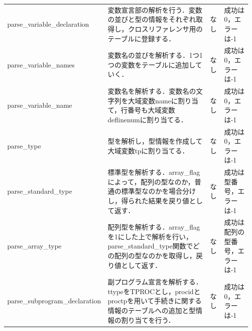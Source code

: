 \documentclass{jlreq}
\begin{document}
\begin{table}[H]
{\begin{tabular}{|l|p{15cm}|l|p{6cm}|}
      parse\_variable\_declaration    & 変数宣言部の解析を行う．変数の並びと型の情報をそれぞれ取得し，クロスリファレンサ用のテーブルに登録する．                                                                                                                                                       & なし & 成功は0，エラーは-1                \\
      parse\_variable\_names          & 変数名の並びを解析する．1つ1つの変数をテーブルに追加していく．                                                                                                                                                                                                 & なし & 成功は0，エラーは-1                \\
      parse\_variable\_name           & 変数名を解析する．変数名の文字列を大域変数nameに割り当て，行番号も大域変数deflinenumに割り当てる．                                                                                                                                                             & なし & 成功は0，エラーは-1                \\
      parse\_type                     & 型を解析し，型情報を作成して大域変数tpに割り当てる．                                                                                                                                                                                                           & なし & 成功は0，エラーは-1                \\
      parse\_standard\_type           & 標準型を解析する．array\_flagによって，配列の型なのか，普通の標準型なのかを場合分けし，得られた結果を戻り値として返す．                                                                                                                                        & なし & 成功は型番号，エラーは-1           \\
      parse\_array\_type              & 配列型を解析する．array\_flagを1にした上で解析を行い，parse\_standard\_type関数でどの配列の型なのかを取得し，戻り値として返す．                                                                                                                                & なし & 成功は配列の型番号，エラーは-1     \\
      parse\_subprogram\_declaration  & 副プログラム宣言を解析する．ttypeをTPROCとし，procidとproctpを用いて手続きに関する情報のテーブルへの追加と型情報の割り当てを行う．                                                                                                                             & なし & 成功は0，エラーは-1                \\

\end{tabular}}
\end{table}
\end{document}
